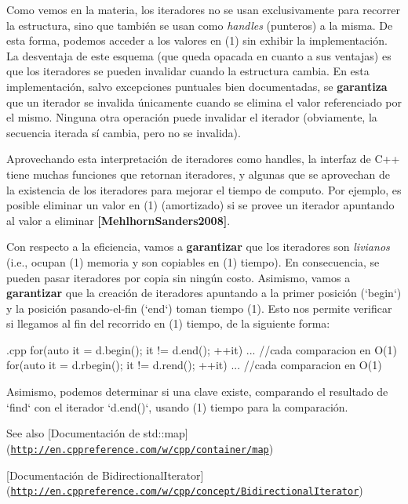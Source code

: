 \-Como vemos en la materia, los iteradores no se usan exclusivamente para recorrer la estructura, sino que también se usan como {\itshape handles\/} (punteros) a la misma. \-De esta forma, podemos acceder a los valores en (1) sin exhibir la implementación. \-La desventaja de este esquema (que queda opacada en cuanto a sus ventajas) es que los iteradores se pueden invalidar cuando la estructura cambia. \-En esta implementación, salvo excepciones puntuales bien documentadas, se {\bfseries garantiza} que un iterador se invalida únicamente cuando se elimina el valor referenciado por el mismo. \-Ninguna otra operación puede invalidar el iterador (obviamente, la secuencia iterada sí cambia, pero no se invalida).

\-Aprovechando esta interpretación de iteradores como handles, la interfaz de \-C++ tiene muchas funciones que retornan iteradores, y algunas que se aprovechan de la existencia de los iteradores para mejorar el tiempo de computo. \-Por ejemplo, es posible eliminar un valor en (1) (amortizado) si se provee un iterador apuntando al valor a eliminar {\bfseries [\-Mehlhorn\-Sanders2008]}.

\-Con respecto a la eficiencia, vamos a {\bfseries garantizar} que los iteradores son {\itshape livianos\/} (i.\-e., ocupan (1) memoria y son copiables en (1) tiempo). \-En consecuencia, se pueden pasar iteradores por copia sin ningún costo. \-Asimismo, vamos a {\bfseries garantizar} que la creación de iteradores apuntando a la primer posición (`begin`) y la posición pasando-\/el-\/fin (`end`) toman tiempo (1). \-Esto nos permite verificar si llegamos al fin del recorrido en (1) tiempo, de la siguiente forma\-: 
\begin{DoxyCode}
 {.cpp}
 for(auto it = d.begin(); it != d.end(); ++it) {...}   //cada comparacion en
       O(1)
 for(auto it = d.rbegin(); it != d.rend(); ++it) {...} //cada comparacion en
       O(1)
\end{DoxyCode}
 \-Asimismo, podemos determinar si una clave existe, comparando el resultado de `find` con el iterador `d.end()`, usando (1) tiempo para la comparación.

\begin{DoxySeeAlso}{\-See also}
\mbox{[}\-Documentación de std\-::map\mbox{]}(\href{http://en.cppreference.com/w/cpp/container/map}{\tt http\-://en.\-cppreference.\-com/w/cpp/container/map})\par
 \mbox{[}\-Documentación de \-Bidirectional\-Iterator\mbox{]}(\href{http://en.cppreference.com/w/cpp/concept/BidirectionalIterator}{\tt http\-://en.\-cppreference.\-com/w/cpp/concept/\-Bidirectional\-Iterator}) 
\end{DoxySeeAlso}
